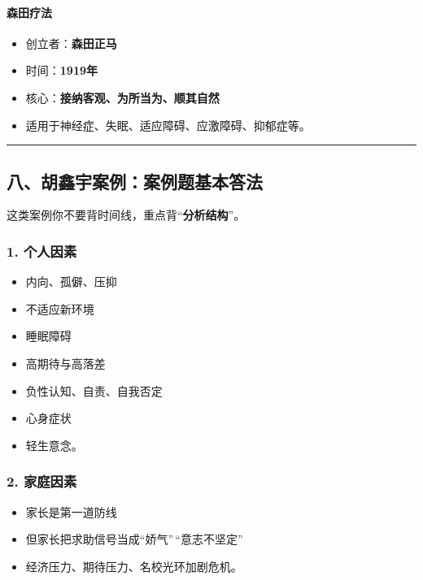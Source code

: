 \documentclass[
  a4paper,
]{ctexart}
\providecommand{\tightlist}{%
  \setlength{\itemsep}{0pt}\setlength{\parskip}{0pt}}
\begin{document}
\paragraph{森田疗法}\label{ux68eeux7530ux7597ux6cd5}

\begin{itemize}
\tightlist
\item
  创立者：\textbf{森田正马}
\item
  时间：\textbf{1919年}
\item
  核心：\textbf{接纳客观、为所当为、顺其自然}
\item
  适用于神经症、失眠、适应障碍、应激障碍、抑郁症等。
\end{itemize}

\begin{center}\rule{0.5\linewidth}{0.5pt}\end{center}

\subsection{八、胡鑫宇案例：案例题基本答法}\label{ux516bux80e1ux946bux5b87ux6848ux4f8bux6848ux4f8bux9898ux57faux672cux7b54ux6cd5}

这类案例你不要背时间线，重点背``\textbf{分析结构}''。

\subsubsection{1. 个人因素}\label{ux4e2aux4ebaux56e0ux7d20}

\begin{itemize}
\tightlist
\item
  内向、孤僻、压抑
\item
  不适应新环境
\item
  睡眠障碍
\item
  高期待与高落差
\item
  负性认知、自责、自我否定
\item
  心身症状
\item
  轻生意念。
\end{itemize}

\subsubsection{2. 家庭因素}\label{ux5bb6ux5eadux56e0ux7d20}

\begin{itemize}
\tightlist
\item
  家长是第一道防线
\item
  但家长把求助信号当成``娇气''\,``意志不坚定''
\item
  经济压力、期待压力、名校光环加剧危机。
\end{itemize}
\end{document}
